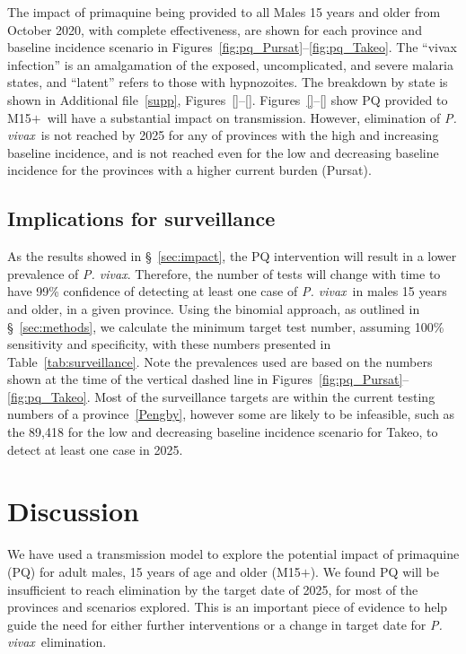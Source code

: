 \documentclass[doublespacing]{bmcart}
\newcommand{\pv}{\textit{P. vivax}}
\newcommand{\males}{M15$+$}
\begin{document}
The impact of primaquine being provided to all Males 15 years and older from October 2020, with complete effectiveness, are shown for each province and baseline incidence scenario in Figures~\ref{fig:pq_Pursat}--\ref{fig:pq_Takeo}. The ``vivax infection'' is an amalgamation of the exposed, uncomplicated, and severe malaria states, and ``latent'' refers to those with hypnozoites. The breakdown by state is shown in Additional file~\ref{supp}, Figures~\ref{}--\ref{}. Figures~\ref{}--\ref{} show PQ provided to \males~will have a substantial impact on transmission. However, elimination of \pv~is not reached by 2025 for any of provinces with the high and increasing baseline incidence, and is not reached even for the low and decreasing baseline incidence for the provinces with a higher current burden (Pursat). 

\subsection*{Implications for surveillance}

As the results showed in \S~\ref{sec:impact}, the PQ intervention will result in a lower prevalence of \pv. Therefore, the number of tests will change with time to have 99\% confidence of detecting at least one case of \pv~in males 15 years and older, in a given province. Using the binomial approach, as outlined in \S~\ref{sec:methods}, we calculate the minimum target test number, assuming 100\% sensitivity and specificity, with these numbers presented in Table~\ref{tab:surveillance}. Note the prevalences used are based on the numbers shown at the time of the vertical dashed line in Figures~\ref{fig:pq_Pursat}--\ref{fig:pq_Takeo}. Most of the surveillance targets are within the current testing numbers of a province~\ref{Pengby}, however some are likely to be infeasible, such as the 89,418 for the low and decreasing baseline incidence scenario for Takeo, to detect at least one case in 2025. 

\section*{Discussion}

We have used a transmission model to explore the potential impact of primaquine (PQ) for adult males, 15 years of age and older (\males). We found PQ will be insufficient to reach elimination by the target date of 2025, for most of the provinces and scenarios explored. This is an important piece of evidence to help guide the need for either further interventions or a change in target date for \pv~elimination. 
\end{document}
